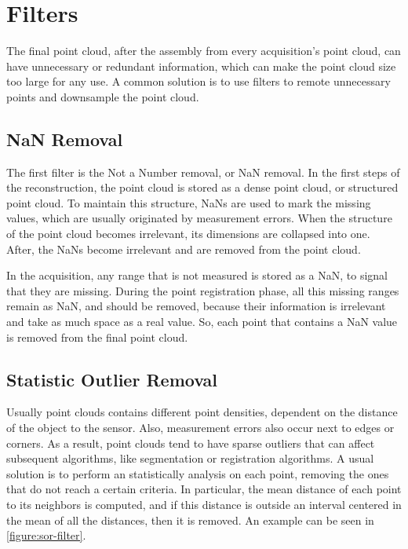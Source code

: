 \section{Filters}
\label{section:filters}

The final point cloud, after the assembly from every acquisition's point cloud, can have unnecessary or redundant information, which can make the point cloud size too large for any use. A common solution is to use filters to remote unnecessary points and downsample the point cloud.

\subsection{NaN Removal}

The first filter is the Not a Number removal, or NaN removal. In the first steps of the reconstruction, the point cloud is stored as a dense point cloud, or structured point cloud. To maintain this structure, NaNs are used to mark the missing values, which are usually originated by measurement errors. When the structure of the point cloud becomes irrelevant, its dimensions are collapsed into one. After, the NaNs become irrelevant and are removed from the point cloud.



In the acquisition, any range that is not measured is stored as a NaN, to signal that they are missing. During the point registration phase, all this missing ranges remain as NaN, and should be removed, because their information is irrelevant and take as much space as a real value. So, each point that contains a NaN value is removed from the final point cloud.

\subsection{Statistic Outlier Removal}

Usually point clouds contains different point densities, dependent on the distance of the object to the sensor. Also, measurement errors also occur next to edges or corners. As a result, point clouds tend to have sparse outliers that can affect subsequent algorithms, like segmentation or registration algorithms. A usual solution is to perform an statistically analysis on each point, removing the ones that do not reach a certain criteria. In particular, the mean distance of each point to its neighbors is computed, and if this distance is outside an interval centered in the mean of all the distances, then it is removed. An example can be seen in \cref{figure:sor-filter}.

